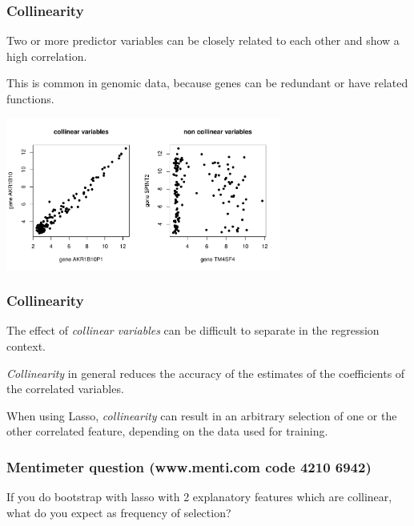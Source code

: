\documentclass[notes]{beamer}          %
\begin{document}
\begin{frame}
\frametitle{Collinearity}
Two or more predictor variables can be closely related to each other and show a high correlation.

\vspace{5mm} 

This is common in genomic data, because genes can be redundant or have related functions.

\begin{center}
\includegraphics[height=5cm]{../figures/week_2_linear_models/collinearity.pdf}
\end{center}

\end{frame}

\begin{frame}
\frametitle{Collinearity}
The effect of \textit{collinear variables} can be difficult to separate in the regression context.

\vspace{5mm} 

\textit{Collinearity} in general reduces the accuracy of the estimates of the coefficients of the correlated variables.

\vspace{5mm} 

When using Lasso, \textit{collinearity} can result in an arbitrary selection of one or the other correlated feature, depending on the data used for training.
\end{frame}

\begin{frame}
\frametitle{Mentimeter question (www.menti.com code 4210 6942)}

If you do bootstrap with lasso with 2 explanatory features which are collinear, what do you expect as frequency of selection?

\end{frame}
\end{document}
